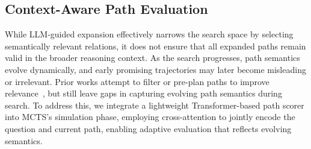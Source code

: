 \subsection{Context-Aware Path Evaluation}

While LLM-guided expansion effectively narrows the search space by selecting semantically relevant relations, it does not ensure that all expanded paths remain valid in the broader reasoning context. As the search progresses, path semantics evolve dynamically, and early promising trajectories may later become misleading or irrelevant. Prior works attempt to filter or pre-plan paths to improve relevance~\citep{fang2024karpa,long2025eperm}, but still leave gaps in capturing evolving path semantics during search. To address this, we integrate a lightweight Transformer-based path scorer into MCTS’s simulation phase, employing cross-attention to jointly encode the question and current path, enabling adaptive evaluation that reflects evolving semantics.


